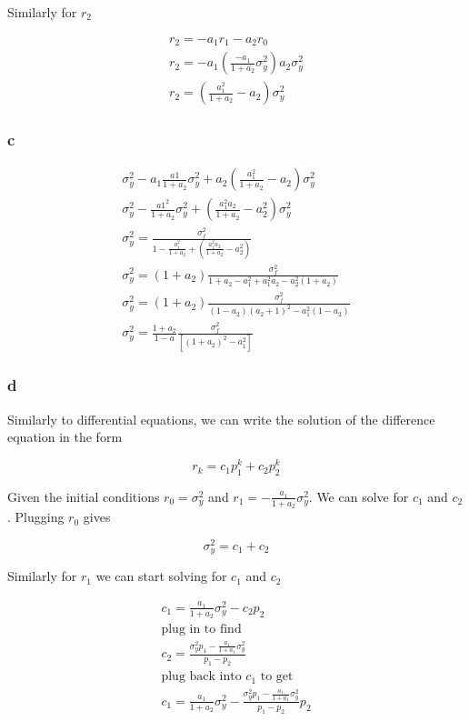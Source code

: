 \documentclass[11pt,a4paper,final]{article}
\begin{document}
Similarly for \(r_2\)

\begin{equation*}
\begin{array}{l}
r_2 = -a_1 r_1 - a_2 r_0 \\
r_2 = -a_1 (\frac{-a_1}{1+a_2}\sigma_y^2) a_2 \sigma_y^2 \\
r_2 = (\frac{a_1^2}{1+a_2} - a_2)\sigma_y^2
\end{array}
\end{equation*}

\subsubsection{c}
\label{sec:org4a508a3}

\begin{equation*}
\begin{array}{l}
\sigma_y^2 - a_1 \frac{a1}{1+a_2}\sigma_y^2 + a_2 (\frac{a_1^2}{1+a_2}-a_2)\sigma_y^2 \\
\sigma_y^2 - \frac{a1^2}{1+a_2}\sigma_y^2+ (\frac{a_1^2 a_2}{1+a_2}-a_2^2)\sigma_y^2 \\
\sigma_y^2 = \frac{\sigma_f^2}{1 - \frac{a_1^2}{1+a_2} + (\frac{a_1^2 a_2}{1+a_2}-a_2^2)}\\
\sigma_y^2 = (1+a_2)\frac{\sigma_f^2}{1+a_2 - a_1^2 + a_1^2 a_2-a_2^2(1+a_2)}\\
\sigma_y^2 = (1+a_2)\frac{\sigma_f^2}{(1-a_2)(a_2 + 1)^2 - a_1^2(1-a_2)} \\
\sigma_y^2 = \frac{1+a_2}{1-a}\frac{\sigma_f^2}{[(1+a_2)^2 - a_1^2]}
\end{array}
\end{equation*}

\subsubsection{d}
\label{sec:org53c9f9a}
Similarly to differential equations, we can write the solution of the difference equation in the form

$$
r_k = c_1 p_1^k + c_2 p_2^k
$$

Given the initial conditions \(r_0 = \sigma_y^2\) and \(r_1 = -\frac{a_1}{1+a_2}\sigma_y^2\). We can solve for \(c_1\) and \(c_2\).
Plugging \(r_0\) gives

\begin{equation*}
\sigma_y^2 = c_1 + c_2
\end{equation*}

Similarly for \(r_1\) we can start solving for \(c_1\) and \(c_2\)

\begin{equation*}
\begin{array}{l}
c_1 = \frac{a_1}{1+a_2}\sigma_y^2 - c_2 p_2 \\
\text{plug in to find} \\
c_2 = \frac{\sigma_y^2 p_1 - \frac{a_1}{1+a_1}\sigma_y^2}{p_1 - p_2} \\
\text{plug back into $c_1$ to get} \\
c_1 = \frac{a_1}{1+a_2}\sigma_y^2 - \frac{\sigma_y^2 p_1 - \frac{a_1}{1+a_1}\sigma_y^2}{p_1 - p_2} p_2 \\
\end{array}
\end{equation*}
\end{document}

